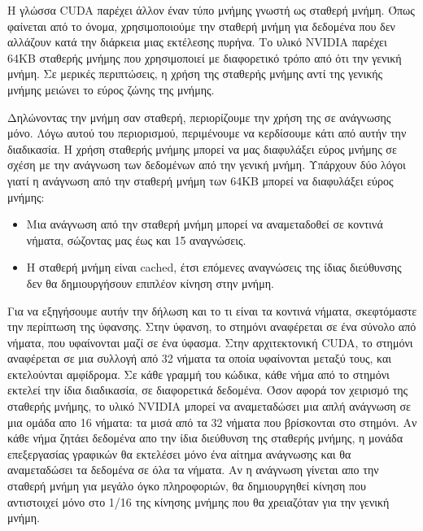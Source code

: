 Η γλώσσα CUDA παρέχει άλλον έναν τύπο μνήμης γνωστή ως σταθερή μνήμη. Όπως φαίνεται από το όνομα, χρησιμοποιούμε την σταθερή μνήμη για δεδομένα που δεν αλλάζουν κατά την διάρκεια μιας εκτέλεσης πυρήνα. Το υλικό NVIDIA παρέχει 64KB σταθερής μνήμης που χρησιμοποιεί με διαφορετικό τρόπο από ότι την γενική μνήμη. Σε μερικές περιπτώσεις, η χρήση της σταθερής μνήμης αντί της γενικής μνήμης μειώνει το εύρος ζώνης της μνήμης. 

Δηλώνοντας την μνήμη σαν σταθερή, περιορίζουμε την χρήση της σε ανάγνωσης μόνο. Λόγω αυτού του περιορισμού, περιμένουμε να κερδίσουμε κάτι από αυτήν την διαδικασία. Η χρήση σταθερής μνήμης μπορεί να μας διαφυλάξει εύρος μνήμης σε σχέση με την ανάγνωση των δεδομένων από την γενική μνήμη. Υπάρχουν δύο λόγοι γιατί η ανάγνωση από την σταθερή μνήμη των 64KB μπορεί να διαφυλάξει εύρος μνήμης:
\begin{itemize}
\item Μια ανάγνωση από την σταθερή μνήμη μπορεί να αναμεταδοθεί σε κοντινά νήματα, σώζοντας μας έως και 15 αναγνώσεις.
\item Η σταθερή μνήμη είναι cached, έτσι επόμενες αναγνώσεις της ίδιας διεύθυνσης δεν θα δημιουργήσουν επιπλέον κίνηση στην μνήμη.
\end{itemize}
Για να εξηγήσουμε αυτήν την δήλωση και το τι είναι τα κοντινά νήματα, σκεφτόμαστε την περίπτωση της ύφανσης. Στην ύφανση, το στημόνι αναφέρεται σε ένα σύνολο από νήματα, που υφαίνονται μαζί σε ένα ύφασμα. Στην αρχιτεκτονική CUDA, το στημόνι αναφέρεται σε μια συλλογή από 32 νήματα τα οποία υφαίνονται μεταξύ τους, και εκτελούνται αμφίδρομα. Σε κάθε γραμμή του κώδικα, κάθε νήμα από το στημόνι εκτελεί την ίδια διαδικασία, σε διαφορετικά δεδομένα.
Όσον αφορά τον χειρισμό της σταθερής μνήμης, το υλικό NVIDIA μπορεί να αναμεταδώσει μια απλή ανάγνωση σε μια ομάδα απο 16 νήματα: τα μισά από τα 32 νήματα που βρίσκονται στο στημόνι. Αν κάθε νήμα ζητάει δεδομένα απο την ίδια διεύθυνση της σταθερής μνήμης, η μονάδα επεξεργασίας γραφικών θα εκτελέσει μόνο ένα αίτημα ανάγνωσης και θα αναμεταδώσει τα δεδομένα σε όλα τα νήματα. Αν η ανάγνωση γίνεται απο την σταθερή μνήμη για μεγάλο όγκο πληροφοριών, θα δημιουργηθεί κίνηση που αντιστοιχεί μόνο στο 1/16 της κίνησης μνήμης που θα χρειαζόταν για την γενική μνήμη.

